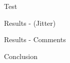 \documentclass[xcolor=dvipsnames]{beamer}
\begin{document}
\begin{section}{Test}
\begin{frame}{\hskip 0.3cm Results - (Jitter)}
\end{frame}












\begin{frame}{\hskip 0.3cm Results - Comments}
\end{frame}












\end{section}
\begin{section}{Conclusion}












\begin{frame}{\hskip 0.3cm }
\end{frame}












\end{section}
\end{document}
